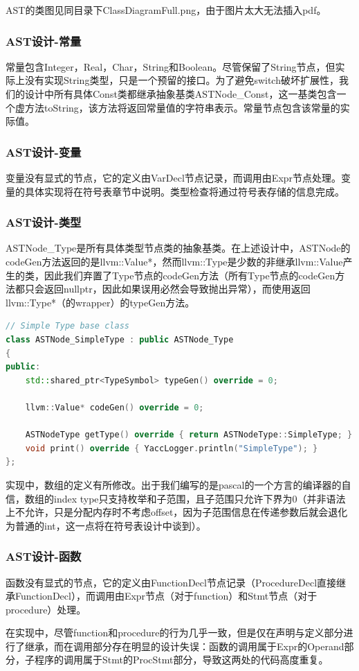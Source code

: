 \documentclass{article}
\begin{document}
\par AST的类图见同目录下ClassDiagramFull.png，由于图片太大无法插入pdf。

\subsubsection{AST设计-常量}
\par 常量包含Integer，Real，Char，String和Boolean。尽管保留了String节点，但实际上没有实现String类型，只是一个预留的接口。为了避免switch破坏扩展性，我们的设计中所有具体Const类都继承抽象基类ASTNode\_Const，这一基类包含一个虚方法toString，该方法将返回常量值的字符串表示。常量节点包含该常量的实际值。

\subsubsection{AST设计-变量}
\par 变量没有显式的节点，它的定义由VarDecl节点记录，而调用由Expr节点处理。变量的具体实现将在符号表章节中说明。类型检查将通过符号表存储的信息完成。

\subsubsection{AST设计-类型}
\par ASTNode\_Type是所有具体类型节点类的抽象基类。在上述设计中，ASTNode的codeGen方法返回的是llvm::Value*，然而llvm::Type是少数的非继承llvm::Value产生的类，因此我们弃置了Type节点的codeGen方法（所有Type节点的codeGen方法都只会返回nullptr，因此如果误用必然会导致抛出异常），而使用返回llvm::Type*（的wrapper）的typeGen方法。
\begin{lstlisting}[language=C++]
// Simple Type base class
class ASTNode_SimpleType : public ASTNode_Type
{
public:
    std::shared_ptr<TypeSymbol> typeGen() override = 0;

    llvm::Value* codeGen() override = 0;

    ASTNodeType getType() override { return ASTNodeType::SimpleType; }
    void print() override { YaccLogger.println("SimpleType"); }
};
\end{lstlisting}
\par 实现中，数组的定义有所修改。出于我们编写的是pascal的一个方言的编译器的自信，数组的index type只支持枚举和子范围，且子范围只允许下界为0（并非语法上不允许，只是分配内存时不考虑offset，因为子范围信息在传递参数后就会退化为普通的int，这一点将在符号表设计中谈到）。

\subsubsection{AST设计-函数}
\par 函数没有显式的节点，它的定义由FunctionDecl节点记录（ProcedureDecl直接继承FunctionDecl），而调用由Expr节点（对于function）和Stmt节点（对于procedure）处理。
\par 在实现中，尽管function和procedure的行为几乎一致，但是仅在声明与定义部分进行了继承，而在调用部分存在明显的设计失误：函数的调用属于Expr的Operand部分，子程序的调用属于Stmt的ProcStmt部分，导致这两处的代码高度重复。
\end{document}
